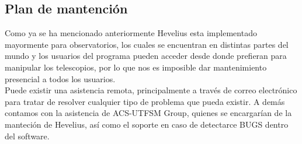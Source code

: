 \documentclass[letterpaper,titlepage,spanish,10pt]{article}
\begin{document}
\subsection{Plan de mantenci\'on}
Como ya se ha mencionado anteriormente Hevelius esta implementado mayormente 
para observatorios, los cuales se encuentran en distintas partes del mundo y 
los usuarios del programa pueden acceder desde donde prefieran para manipular 
los telescopios, por lo que nos es imposible dar mantenimiento presencial a 
todos los usuarios.\\

Puede existir una asistencia remota, principalmente a trav\'es de correo 
electr\'onico para tratar de resolver cualquier tipo de problema que pueda 
existir.
A dem\'as contamos con la asistencia de ACS-UTFSM Group, quienes se encargar\'ian 
de la manteci\'on de Hevelius, as\'i como el soporte en caso de detectarce 
BUGS dentro del software.
\end{document}

